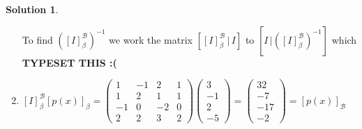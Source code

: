 \documentclass[10pt]{article}
\theoremstyle{definition}
\newtheorem{soln}{Solution}
\begin{document}
\begin{soln}
\begin{enumerate}[label=(\alph*)]
          To find $\left(\left[I\right]_\beta^\mathcal{B}\right)^{-1}$ we work the matrix $\left[\left[I\right]_\beta^\mathcal{B}\,|\,I \right]$ to
          $\left[I\,|\left(\left[I\right]_\beta^\mathcal{B}\right)^{-1}\right]$ which \textbf{TYPESET THIS :(}
    \item $\left[I\right]_\beta^\mathcal{B}\left[p(x)\right]_\beta=\begin{pmatrix}
              1  & -1 & 2  & 1 \\
              1  & 2  & 1  & 1 \\
              -1 & 0  & -2 & 0 \\
              2  & 2  & 3  & 2
            \end{pmatrix}\begin{pmatrix}
              3  \\
              -1 \\
              2  \\
              -5
            \end{pmatrix}=
            \begin{pmatrix}
              32  \\
              -7  \\
              -17 \\
              -2
            \end{pmatrix}=\left[p(x)\right]_\mathcal{B}$
  \end{enumerate}
\end{soln}
\end{document}
